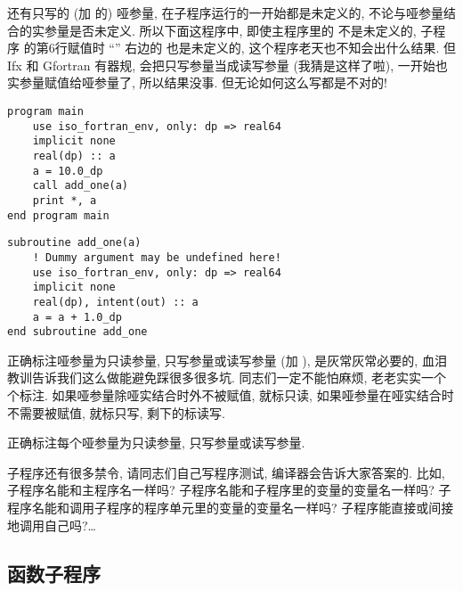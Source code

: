 还有只写的 (加  的) 哑参量, 在子程序运行的一开始都是未定义的, 不论与哑参量结合的实参量是否未定义. 所以下面这程序中, 即使主程序里的  不是未定义的, 子程序  的第6行赋值时 ``\ttt{=}'' 右边的  也是未定义的, 这个程序老天也不知会出什么结果. 但 Ifx 和 Gfortran 有器规, 会把只写参量当成读写参量 (我猜是这样了啦), 一开始也实参量赋值给哑参量了, 所以结果没事. 但无论如何这么写都是不对的!
\begin{lstlisting} 
program main
    use iso_fortran_env, only: dp => real64
    implicit none
    real(dp) :: a
    a = 10.0_dp
    call add_one(a)
    print *, a
end program main
\end{lstlisting}
\begin{lstlisting}
subroutine add_one(a)
    ! Dummy argument may be undefined here!
    use iso_fortran_env, only: dp => real64
    implicit none
    real(dp), intent(out) :: a
    a = a + 1.0_dp
end subroutine add_one
\end{lstlisting} 

正确标注哑参量为只读参量, 只写参量或读写参量\label{arguments} (加 ), 是灰常灰常必要的, 血泪教训告诉我们这么做能避免踩很多很多坑. 同志们一定不能怕麻烦, 老老实实一个个标注. 如果哑参量除哑实结合时外不被赋值, 就标只读, 如果哑参量在哑实结合时不需要被赋值, 就标只写, 剩下的标读写. 
\begin{convention} 
    正确标注每个哑参量为只读参量, 只写参量或读写参量. 
\end{convention} 

子程序还有很多禁令, 请同志们自己写程序测试, 编译器会告诉大家答案的. 比如, 子程序名能和主程序名一样吗? 子程序名能和子程序里的变量的变量名一样吗? 子程序名能和调用子程序的程序单元里的变量的变量名一样吗? 子程序能直接或间接地调用自己吗?\dots{}

\subsection{函数子程序} 

